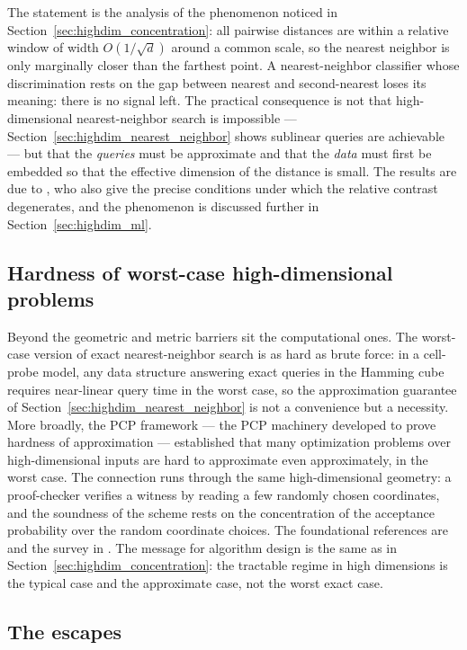 The statement is the analysis of the phenomenon noticed in
Section~\ref{sec:highdim_concentration}: all pairwise distances are within a
relative window of width $O(1/\sqrt{d})$ around a common scale, so the
nearest neighbor is only marginally closer than the farthest point. A
nearest-neighbor classifier whose discrimination rests on the gap between
nearest and second-nearest loses its meaning: there is no signal left.
The practical consequence is not that high-dimensional nearest-neighbor search
is impossible --- Section~\ref{sec:highdim_nearest_neighbor} shows sublinear
queries are achievable --- but that the \emph{queries} must be approximate and
that the \emph{data} must first be embedded so that the effective dimension of
the distance is small. The results are due to \cite{beyer1999}, who also give
the precise conditions under which the relative contrast degenerates, and the
phenomenon is discussed further in Section~\ref{sec:highdim_ml}.

\subsection{Hardness of worst-case high-dimensional problems}

Beyond the geometric and metric barriers sit the computational ones. The
worst-case version of exact nearest-neighbor search is as hard as brute force:
in a cell-probe model, any data structure answering exact queries in the
Hamming cube requires near-linear query time in the worst case, so the
approximation guarantee of Section~\ref{sec:highdim_nearest_neighbor} is not
a convenience but a necessity. More broadly, the PCP framework --- the
PCP machinery developed to prove
hardness of approximation --- established that many optimization problems over
high-dimensional inputs are hard to approximate even approximately, in the
worst case. The connection runs through the same high-dimensional geometry:
a proof-checker verifies a witness by reading a few randomly chosen
coordinates, and the soundness of the scheme rests on the concentration of
the acceptance probability over the random coordinate choices. The
foundational references are \cite{arora1994} and the survey in
\cite{harpeled2011}. The message for algorithm design is the same as in
Section~\ref{sec:highdim_concentration}: the tractable regime in high
dimensions is the typical case and the approximate case, not the worst exact
case.

\subsection{The escapes}


